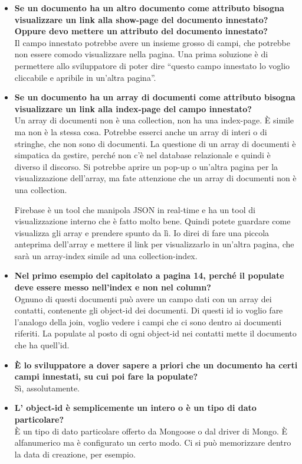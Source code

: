 \begin{itemize}
		\item
		{\bfseries Se un documento ha un altro documento come attributo bisogna visualizzare un link alla show-page del documento innestato? Oppure devo mettere un attributo del documento innestato?} \\
		Il campo innestato potrebbe avere un insieme grosso di campi, che potrebbe non essere comodo visualizzare nella pagina. Una prima soluzione è di permettere allo sviluppatore di poter dire ``questo campo innestato lo voglio cliccabile e apribile in un'altra pagina''.
		
		\item
		{\bfseries Se un documento ha un array di documenti come attributo bisogna visualizzare un link alla index-page del campo innestato?} \\
		Un array di documenti non è una collection, non ha una index-page. È simile ma non è la stessa cosa. Potrebbe esserci anche un array di interi o di stringhe, che non sono di documenti. La questione di un array di documenti è simpatica da gestire, perché non c'è nel database relazionale e quindi è diverso il discorso. Si potrebbe aprire un pop-up o un'altra pagina per la visualizzazione dell'array, ma fate attenzione che un array di documenti non è una collection.
		
		Firebase è un tool che manipola JSON in real-time e ha un tool di visualizzazione interno che è fatto molto bene. Quindi potete guardare come visualizza gli array e prendere spunto da lì. Io direi di fare una piccola anteprima dell'array e mettere il link per visualizzarlo in un'altra pagina, che sarà un array-index simile ad una collection-index.
		
		\item
		{\bfseries Nel primo esempio del capitolato a pagina 14, perché il populate deve essere messo nell'index e non nel column?} \\
		Ognuno di questi documenti può avere un campo dati con un array dei contatti, contenente gli object-id dei documenti. Di questi id io voglio fare l'analogo della join, voglio vedere i campi che ci sono dentro ai documenti riferiti. La populate al posto di ogni object-id nei contatti mette il documento che ha quell'id.
		
		\item
		{\bfseries È lo sviluppatore a dover sapere a priori che un documento ha certi campi innestati, su cui poi fare la populate?} \\
		Sì, assolutamente.
		
		\item
		{\bfseries L' object-id è semplicemente un intero o è un tipo di dato particolare?} \\
		È un tipo di dato particolare offerto da Mongoose o dal driver di Mongo. È alfanumerico ma è configurato un certo modo. Ci si può memorizzare dentro la data di creazione, per esempio.
		

\end{itemize}
